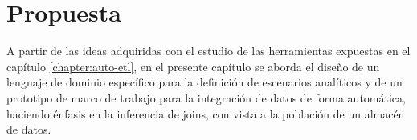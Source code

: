 \chapter{Propuesta}\label{chapter:proposal}

A partir de las ideas adquiridas con el estudio de las herramientas expuestas en el cap\'itulo \ref{chapter:auto-etl}, 
en el presente capítulo se aborda el diseño de un lenguaje de dominio específico para la definición de 
escenarios analíticos y de un prototipo de marco de trabajo para la integración de datos de forma automática, 
haciendo énfasis en la inferencia de joins, con vista a la población de un almacén de datos.

